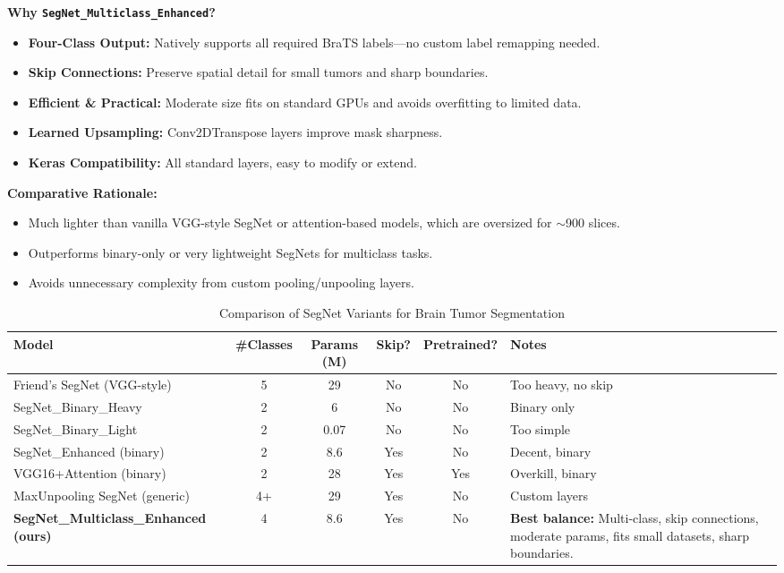 \noindent\textbf{Why \texttt{SegNet\_Multiclass\_Enhanced}?}
\begin{itemize}
    \item \textbf{Four-Class Output:} Natively supports all required BraTS labels---no custom label remapping needed.
    \item \textbf{Skip Connections:} Preserve spatial detail for small tumors and sharp boundaries.
    \item \textbf{Efficient \& Practical:} Moderate size fits on standard GPUs and avoids overfitting to limited data.
    \item \textbf{Learned Upsampling:} Conv2DTranspose layers improve mask sharpness.
    \item \textbf{Keras Compatibility:} All standard layers, easy to modify or extend.
\end{itemize}

\noindent\textbf{Comparative Rationale:}
\begin{itemize}
    \item Much lighter than vanilla VGG-style SegNet or attention-based models, which are oversized for $\sim$900 slices.
    \item Outperforms binary-only or very lightweight SegNets for multiclass tasks.
    \item Avoids unnecessary complexity from custom pooling/unpooling layers.
\end{itemize}

\begin{table}[ht]
\scriptsize
\renewcommand{\arraystretch}{1.7}
\setlength{\tabcolsep}{2pt}
\begin{tabular}{|l|c|c|c|c|p{3cm}|}
\hline
\textbf{Model} & \textbf{\#Classes} & \textbf{Params (M)} & \textbf{Skip?} & \textbf{Pretrained?} & \textbf{Notes} \\
\hline
Friend's SegNet (VGG-style)   & 5   & 29   & No  & No  & Too heavy, no skip \\
\hline
SegNet\_Binary\_Heavy         & 2   & 6    & No  & No  & Binary only \\
\hline
SegNet\_Binary\_Light         & 2   & 0.07 & No  & No  & Too simple \\
\hline
SegNet\_Enhanced (binary)     & 2   & 8.6  & Yes & No  & Decent, binary \\
\hline
VGG16+Attention (binary)      & 2   & 28   & Yes & Yes & Overkill, binary \\
\hline
MaxUnpooling SegNet (generic) & 4+  & 29   & Yes & No  & Custom layers \\
\hline
\textbf{SegNet\_Multiclass\_Enhanced (ours)} & 4 & 8.6 & Yes & No  & \textbf{Best balance:} Multi-class, skip connections, moderate params, fits small datasets, sharp boundaries. \\
\hline
\end{tabular}
\caption{Comparison of SegNet Variants for Brain Tumor Segmentation}
\label{tab:segnet-comparison}
\end{table}

